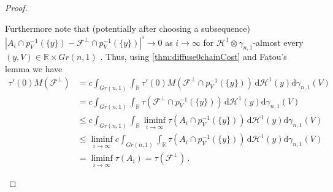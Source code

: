 \documentclass[10pt,a4paper,oneside,final]{article}
\newcommand{\R}{{\mathbb{R}}}
\newcommand{\de}{{\mathrm{d}}}
\DeclareMathOperator{\dv}{div}
\newcommand{\hdone}{\mathcal{H}^1}
\newcommand{\restr}{{\mbox{\LARGE$\llcorner$}}}
\newcommand{\mass}[1]{M(#1)}
\newcommand{\flatNorm}[1]{|#1|^\flat}
\newcommand{\Wd}[1]{\mathrm{W}_{#1}}
\newcommand{\Wdone}{\Wd{1}}
\newcommand{\flux}{{\mathcal{F}}}
\newcommand{\JEn}{{\mathcal{J}}}
\numberwithin{equation}{section}
\theoremstyle{plain}
\theoremstyle{definition}
\theoremstyle{remark}
\begin{document}
\begin{proof}
\begin{itemize}
Furthermore note that (potentially after choosing a subsequence)
$\flatNorm{A_i\cap p_V^{-1}(\{y\})-\flux^\perp\cap p_V^{-1}(\{y\})}\to0$ as $i\to\infty$ for $\hdone\otimes\gamma_{n,1}$-almost every $(y,V)\in\R\times Gr(n,1)$ \cite[step\,2 in proof of Prop.\,2.5]{CoRoMa17}.
Thus, using \cref{thm:diffuse0chainCost} and Fatou's lemma we have
\begin{align*}
\tau'(0)\mass{\flux^\perp}
&=c\int_{Gr(n,1)}\int_\R\tau'(0)\mass{\flux^\perp\cap p_V^{-1}(\{y\})}\,\de\hdone(y)\de\gamma_{n,1}(V)\\
&=c\int_{Gr(n,1)}\int_\R\tau(\flux^\perp\cap p_V^{-1}(\{y\}))\,\de\hdone(y)\de\gamma_{n,1}(V)\\
&\leq c\int_{Gr(n,1)}\int_\R\liminf_{i\to\infty}\tau(A_i\cap p_V^{-1}(\{y\}))\,\de\hdone(y)\de\gamma_{n,1}(V)\\
&\leq\liminf_{i\to\infty}c\int_{Gr(n,1)}\int_\R\tau(A_i\cap p_V^{-1}(\{y\}))\,\de\hdone(y)\de\gamma_{n,1}(V)\\
&=\liminf_{i\to\infty}\tau(A_i)
=\tau(\flux^\perp)\,.
\end{align*}

\end{itemize}
\end{proof}
\end{document}
